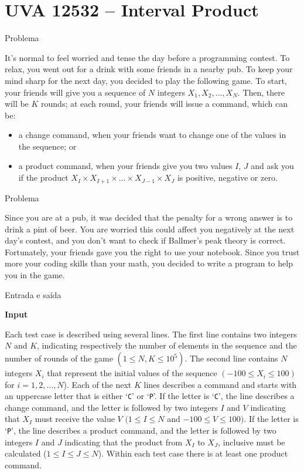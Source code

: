 \section{UVA 12532 -- Interval Product}

\begin{frame}[fragile]{Problema}

It’s normal to feel worried and tense the day before a programming contest. To relax, you went out 
for a drink with some friends in a nearby pub. To keep your mind sharp for the next day, you 
decided to play the following game. To start, your friends will give you a sequence of $N$ integers 
$X_1, X_2, \ldots, X_N$.  Then, there will be $K$ rounds; at each round, your friends will issue a 
command, which can be:
\begin{itemize}
    \item a change command, when your friends want to change one of the values in the sequence; or
    \item a product command, when your friends give you two values $I$, $J$ and ask you if the 
        product $X_I\times X_{I+1}\times \ldots\times X_{J-1}\times X_J$ is positive, negative or zero.
\end{itemize}

\end{frame}

\begin{frame}[fragile]{Problema}

Since you are at a pub, it was decided that the penalty for a wrong answer is to drink a pint of
beer. You are worried this could affect you negatively at the next day’s contest, and you don’t want
to check if Ballmer’s peak theory is correct. Fortunately, your friends gave you the right to use your
notebook. Since you trust more your coding skills than your math, you decided to write a program to
help you in the game.

\end{frame}

\begin{frame}[fragile]{Entrada e saída}

\textbf{Input}

Each test case is described using several lines. The first line contains two integers $N$ and $K$,
indicating respectively the number of elements in the sequence and the number of rounds of the game 
$(1\leq N, K\leq 10^5)$. 
The second line contains $N$ integers $X_i$ that represent the initial values of the sequence
$(-100\leq X_i\leq 100)$ for $i = 1, 2, \ldots, N$). Each of the next $K$ lines describes a command 
and starts with an uppercase letter that is either ‘\texttt{C}’ or ‘\texttt{P}’. 
If the letter is ‘\texttt{C}’, the line describes a change command, and the letter is followed by 
two integers $I$ and $V$ indicating that $X_I$ must receive the value $V$ $(1\leq I\leq N$ and 
$-100\leq V\leq 100)$. If the letter is ‘\texttt{P}’, the line describes a product command, and 
the letter is followed by two integers $I$ and $J$ indicating that the product from 
$X_I$ to $X_J$, inclusive must be calculated ($1\leq I\leq J\leq N$). Within each test case there 
is at least one product command.

\end{frame}

